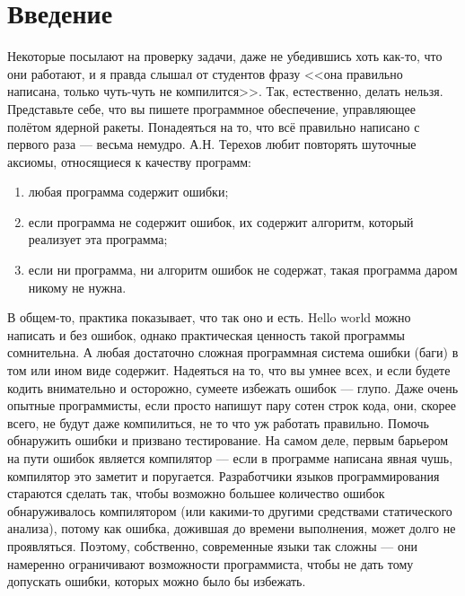 \documentclass{../../text-style}
\begin{document}
\maketitle
\thispagestyle{empty}

\section{Введение}

Некоторые посылают на проверку задачи, даже не убедившись хоть как-то, что они работают, и я правда слышал от студентов фразу <<она правильно написана, только чуть-чуть не компилится>>. Так, естественно, делать нельзя. Представьте себе, что вы пишете программное обеспечение, управляющее полётом ядерной ракеты. Понадеяться на то, что всё правильно написано с первого раза --- весьма немудро. А.Н. Терехов любит повторять шуточные аксиомы, относящиеся к качеству программ:

\begin{enumerate}
    \item любая программа содержит ошибки;
    \item если программа не содержит ошибок, их содержит алгоритм, который реализует эта программа;
    \item если ни программа, ни алгоритм ошибок не содержат, такая программа даром никому не нужна.
\end{enumerate}

В общем-то, практика показывает, что так оно и есть. Hello world можно написать и без ошибок, однако практическая ценность такой программы сомнительна. А любая достаточно сложная программная система ошибки (баги) в том или ином виде содержит. Надеяться на то, что вы умнее всех, и если будете кодить внимательно и осторожно, сумеете избежать ошибок --- глупо. Даже очень опытные программисты, если просто напишут пару сотен строк кода, они, скорее всего, не будут даже компилиться, не то что уж работать правильно. Помочь обнаружить ошибки и призвано тестирование. На самом деле, первым барьером на пути ошибок является компилятор --- если в программе написана явная чушь, компилятор это заметит и поругается. Разработчики языков программирования стараются сделать так, чтобы возможно большее количество ошибок обнаруживалось компилятором (или какими-то другими средствами статического анализа), потому как ошибка, дожившая до времени выполнения, может долго не проявляться. Поэтому, собственно, современные языки так сложны --- они намеренно ограничивают возможности программиста, чтобы не дать тому допускать ошибки, которых можно было бы избежать.
\end{document}
